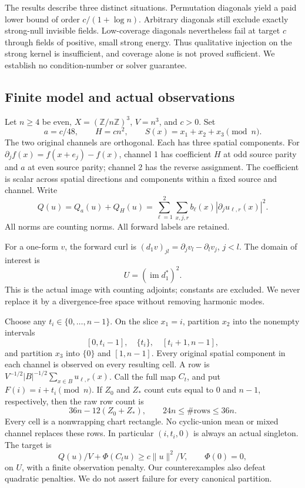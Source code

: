 \documentclass[11pt,a4paper]{article}
\newcommand{\Z}{\mathbb Z}
\newcommand{\norm}[1]{\lVert#1\rVert}
\newcommand{\im}{\operatorname{im}}
\begin{document}
The results describe three distinct situations. Permutation diagonals yield a
paid lower bound of order $c/(1+\log n)$. Arbitrary diagonals still exclude
exactly strong-null invisible fields. Low-coverage diagonals nevertheless fail
at target $c$ through fields of positive, small strong energy. Thus qualitative
injection on the strong kernel is insufficient, and coverage alone is not
proved sufficient. We establish no condition-number or solver guarantee.

\subsection{Finite model and actual observations}
Let $n\geq4$ be even, $X=(\Z/n\Z)^3$, $V=n^3$, and $c>0$. Set
\[
 a=c/48,\qquad H=cn^2,\qquad S(x)=x_1+x_2+x_3\pmod n.
\]
The two original channels are orthogonal. Each has three spatial components.
For $\partial_j f(x)=f(x+e_j)-f(x)$, channel 1 has coefficient $H$ at odd
source parity and $a$ at even source parity; channel 2 has the reverse
assignment. The coefficient is scalar across spatial directions and
components within a fixed source and channel. Write
\[
 Q(u)=Q_a(u)+Q_H(u)
 =\sum_{\ell=1}^2\sum_{x,j,r} b_\ell(x)
       |\partial_j u_{\ell,r}(x)|^2.
\]
All norms are counting norms. All forward labels are retained.

For a one-form $v$, the forward curl is
$(d_1v)_{jl}=\partial_jv_l-\partial_lv_j$, $j<l$. The domain of interest is
\[
 U=(\im d_1^*)^2.
\]
This is the actual image with counting adjoints; constants are excluded.
We never replace it by a divergence-free space without removing harmonic modes.

Choose any $t_i\in\{0,\ldots,n-1\}$. On the slice $x_1=i$, partition $x_2$
into the nonempty intervals
\[
 [0,t_i-1],\quad\{t_i\},\quad[t_i+1,n-1],
\]
and partition $x_3$ into $\{0\}$ and $[1,n-1]$. Every original spatial
component in each channel is observed on every resulting cell. A row is
$V^{-1/2}|B|^{-1/2}\sum_{x\in B}u_{\ell,r}(x)$.
Call the full map $C_t$, and put $F(i)=i+t_i\pmod n$. If $Z_0$ and $Z_*$
count cuts equal to $0$ and $n-1$, respectively, then the raw row count is
\[
 36n-12(Z_0+Z_*),\qquad 24n\leq\#\text{rows}\leq36n.
\]
Every cell is a nonwrapping chart rectangle. No cyclic-union mean or mixed
channel replaces these rows. In particular $(i,t_i,0)$ is always an actual
singleton. The target is
\begin{equation}\label{target}
 Q(u)/V+\Phi(C_tu)\geq c\norm{u}^2/V,\qquad \Phi(0)=0,
\end{equation}
on $U$, with a finite observation penalty. Our counterexamples also defeat
quadratic penalties. We do not assert failure for every canonical partition.
\end{document}
